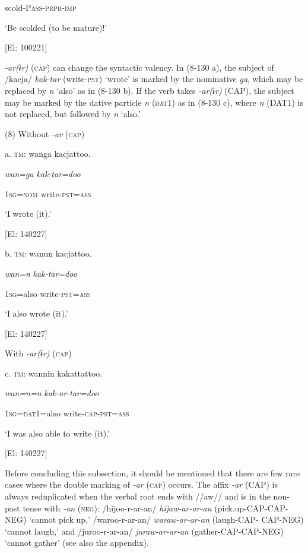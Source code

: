     scold-P\textsc{ass}-\textsc{prpr}-\textsc{imp}

    ‘Be scolded (to be mature)!’

    [El: 100221]

  \textit{{}-ar(ɨr)} (\textsc{cap}) can change the syntactic valency. In (8-130 a), the subject of /kacja/ \textit{kak-tar} (write-\textsc{pst}) ‘wrote’ is marked by the nominative \textit{ga}, which may be replaced by \textit{n} ‘also’ as in (8-130 b). If the verb takes \textit{{}-ar(ɨr)} (CAP), the subject may be marked by the dative particle \textit{n} (\textsc{dat}1) as in (8-130 c), where \textit{n} (DAT1) is not replaced, but followed by \textit{n} ‘also.’

(8)  Without \textit{{}-ar} (\textsc{cap})

  a.  \textsc{tm}:  wanga  kacjattoo.

      \textit{wan=ga}  \textit{kak-tar=doo}

      1\textsc{sg}=\textsc{nom}  write-\textsc{pst}=\textsc{ass}

      ‘I wrote (it).’

      [El: 140227]

  b.  \textsc{tm}:  wanun  kacjattoo.

      \textit{wan=n}  \textit{kak-tar=doo}

      1\textsc{sg}=also  write-\textsc{pst}=\textsc{ass}

      ‘I also wrote (it).’

      [El: 140227]

  With \textit{{}-ar(ɨr)} (\textsc{cap})

  c.  \textsc{tm}:  wannin  kakattattoo.

      \textit{wan=n=n}  \textit{kak-ar-tar=doo}

      1\textsc{sg}=\textsc{dat}1=also  write-\textsc{cap}-\textsc{pst}=\textsc{ass}

      ‘I was also able to write (it).’

      [El: 140227]

  Before concluding this subsection, it should be mentioned that there are few rare cases where the double marking of \textit{{}-ar} (\textsc{cap}) occurs. The affix \textit{{}-ar} (CAP) is always reduplicated when the verbal root ends with //aw// and is in the non-past tense with \textit{-an} (\textsc{neg}): /hijoo-r-ar-an/ \textit{hijaw-ar-ar-an} (pick.up-CAP-CAP-NEG) ‘cannot pick up,’ /waroo-r-ar-an/ \textit{waraw-ar-ar-an} (laugh-CAP- CAP-NEG) ‘cannot laugh,’ and /juroo-r-ar-an/ \textit{juraw-ar-ar-an} (gather-CAP-CAP-NEG) ‘cannot gather’ (see also the appendix).

